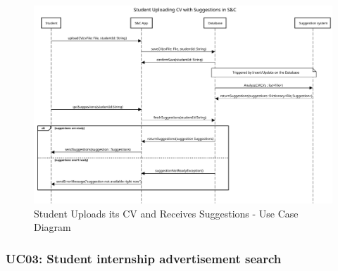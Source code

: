 \begin{figure}[H]
    \centering
    \includegraphics[width=1.0\textwidth]{Images/UC_2.pdf}
    \caption{Student Uploads its CV and Receives Suggestions - Use Case Diagram}
    \label{fig:use-case-diagram-2}
\end{figure}


\subsubsection{UC03: Student internship advertisement search}
\label{subsubsec:student-internship-advertisement-search}

